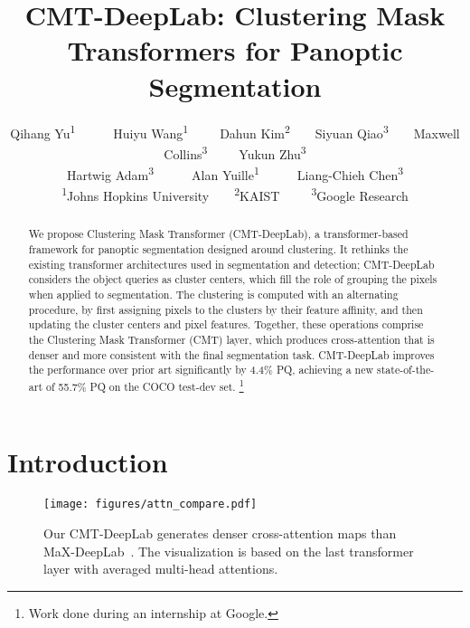 \documentclass[10pt,twocolumn,letterpaper]{article}
\begin{document}
\title{CMT-DeepLab: Clustering Mask Transformers for Panoptic Segmentation}

\author{
Qihang Yu\textsuperscript{1}~~~~~~Huiyu Wang\textsuperscript{1}~~~~~Dahun Kim\textsuperscript{2}~~~~Siyuan Qiao\textsuperscript{3}~~~~Maxwell Collins\textsuperscript{3}~~~~~Yukun Zhu\textsuperscript{3}\\
Hartwig Adam\textsuperscript{3}~~~~~~Alan Yuille\textsuperscript{1}~~~~~~Liang-Chieh Chen\textsuperscript{3}\\\textsuperscript{1}Johns Hopkins University~~~~\textsuperscript{2}KAIST~~~~~\textsuperscript{3}Google Research}

\maketitle

\begin{abstract}
We propose Clustering Mask Transformer (CMT-DeepLab), a transformer-based framework for panoptic segmentation designed around clustering.
It rethinks the existing transformer architectures used in segmentation and detection; CMT-DeepLab considers the object queries as cluster centers, which fill the role of grouping the pixels when applied to segmentation.
The clustering is computed with an alternating procedure,
by first assigning pixels to the clusters by their feature affinity,
and then updating the cluster centers and pixel features.
Together, these operations comprise the Clustering Mask Transformer (CMT) layer,
which produces cross-attention that is denser and more consistent with the final segmentation task. CMT-DeepLab improves the performance over prior art significantly by 4.4\% PQ, achieving a new state-of-the-art of 55.7\% PQ on the COCO test-dev set.
\let\thefootnote\relax\footnote{Work done during an internship at Google.}
\end{abstract} 
\section{Introduction}
\label{sec:intro}

\begin{figure}[t]
    \centering
    \texttt{[image: figures/attn\_compare.pdf]}
    \caption{Our CMT-DeepLab generates denser cross-attention maps than MaX-DeepLab~\cite{wang2021max}. The visualization is based on the last transformer layer with averaged multi-head attentions.
    }
    \label{fig:clusterview_of_seg_new}
\end{figure}
\end{document}
